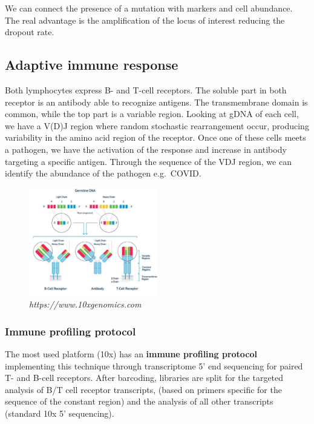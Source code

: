 We can connect the presence of a mutation with markers and cell
abundance. The real advantage is the amplification of the locus of
interest reducing the dropout rate.

\hypertarget{adaptive-immune-response}{%
\subsection{Adaptive immune response}\label{adaptive-immune-response}}

Both lymphocytes express B- and T-cell receptors. The soluble part in
both receptor is an antibody able to recognize antigens. The
transmembrane domain is common, while the top part is a variable region.
Looking at gDNA of each cell, we have a V(D)J region where random
stochastic rearrangement occur, producing variability in the amino acid
region of the receptor. Once one of these cells meets a pathogen, we
have the activation of the response and increase in antibody targeting a
specific antigen. Through the sequence of the VDJ region, we can
identify the abundance of the pathogen e.g.~COVID.

\begin{figure}
\centering
\includegraphics[width=0.5\textwidth]{images/Screenshot_5.png}
\caption{\emph{https://www.10xgenomics.com}}
\end{figure}


\hypertarget{immune-profiling-protocol}{%
\subsubsection{Immune profiling
protocol}\label{immune-profiling-protocol}}

The most used platform (10x) has an \textbf{immune profiling protocol}
implementing this technique through transcriptome 5' end sequencing for
paired T- and B-cell receptors. After barcoding, libraries are split for
the targeted analysis of B/T cell receptor transcripts, (based on
primers specific for the sequence of the constant region) and the
analysis of all other transcripts (standard 10x 5' sequencing).

